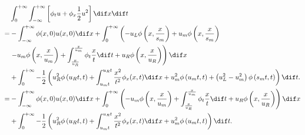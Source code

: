 \documentclass[12pt]{article}
\begin{document}
\begin{align}
	& \int_{0}^{+\infty} \int_{-\infty}^{+\infty}\left[\phi_{t} {u}+\phi_{x} \frac{1}{2}u^2\right] \dif x \dif t \\
	= & -\int_{-\infty}^{+\infty} \phi(x, 0) {u}(x, 0) \dif x + \int_{0}^{+\infty} \left( - u_{L} \phi\left(x, \frac{x}{s_{m}}\right)+u_{m} \phi\left(x, \frac{x}{s_{m}}\right)\right. \\
	&\left.-u_{m} \phi\left(x, \frac{x}{u_{m}}\right)+\int_{\frac{x}{u_{R}}}^{\frac{x}{u_m}} \phi_{t} \frac{x}{t} \dif t + u_{R} \phi\left(x, \frac{x}{u_{R}}\right) \right) \dif x\\
	& + \int_{0}^{+\infty}-\frac{1}{2} \left( u_{R}^{2} \phi\left(u_{R} t, t\right)+\int_{u_{m} t}^{u_{R} t}  \frac{x^{2}}{t^{2}} \phi_{x}(x, t) \dif x +  u_{m}^{2} \phi\left(u_{m} t, t\right) + \left(u_{L}^{2}- u_{m}^{2}\right)  \phi\left(s_{m} t, t\right) \right) \dif t.\\
	= & -\int_{-\infty}^{+\infty} \phi(x, 0) {u}(x, 0) \dif x + \int_{0}^{+\infty} \left(-u_{m} \phi\left(x, \frac{x}{u_{m}}\right)+\int_{\frac{x}{u_{R}}}^{\frac{x}{u_m}} \phi_{t} \frac{x}{t} \dif t + u_{R} \phi\left(x, \frac{x}{u_{R}}\right) \right) \dif x\\
	& + \int_{0}^{+\infty}-\frac{1}{2} \left( u_{R}^{2} \phi\left(u_{R} t, t\right)+\int_{u_{m} t}^{u_{R} t}  \frac{x^{2}}{t^{2}} \phi_{x}(x, t) \dif x +  u_{m}^{2} \phi\left(u_{m} t, t\right)  \right) \dif t.
\end{align}








\end{document}
